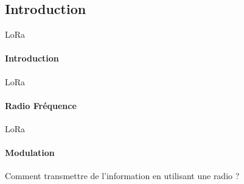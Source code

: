\subsection{Introduction}

\begin{frame}{LoRa}
\framesubtitle{Introduction}

\end{frame}

\begin{frame}{LoRa}
\framesubtitle{Radio Fréquence}
\end{frame}

\begin{frame}{LoRa}
\framesubtitle{Modulation}
\begin{block}{}
{
Comment transmettre de l'information en utilisant une radio ?
}
\end{block}
\vspace{0.5cm}
\end{frame}


